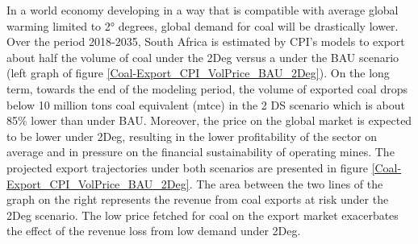 \documentclass[12pt,english]{article}
\begin{document}
In a world economy developing in a way that is compatible with average global warming limited to 2° degrees, global demand for coal will be drastically lower. Over the period 2018-2035, South Africa is estimated by CPI's models to export about half the volume of coal under the 2Deg versus a under the BAU scenario (left graph of figure \ref{Coal-Export_CPI_VolPrice_BAU_2Deg}). %
On the long term, towards the end of the modeling period, the volume of exported coal drops below 10 million tons coal equivalent (mtce) in the 2 DS scenario which is about 85\% lower than under BAU. Moreover, the price on the global market is expected to be lower under 2Deg, resulting in the lower profitability of the sector on average and in pressure %
on the financial sustainability of operating mines. %
The projected export trajectories under both scenarios are presented in figure \ref{Coal-Export_CPI_VolPrice_BAU_2Deg}. The area between the two lines of the graph on the right represents the revenue from coal exports at risk under the 2Deg scenario. The low price fetched for coal on the export market exacerbates the effect of the revenue loss from low demand under 2Deg. 
\end{document}
